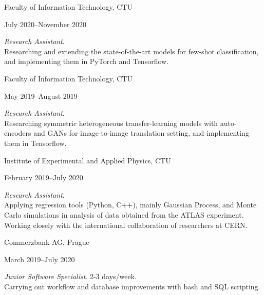 \documentclass[10pt]{article}
\begin{document}
\begin{large}
    Faculty of Information Technology, CTU\hfill
    \begin{small}
        July 2020--November 2020\\[0.2em]
    \end{small}
\end{large}
\begin{normalsize}
    \textit{Research Assistant}.\\[0.2em]
    Researching and extending the state-of-the-art models for few-shot classification, and implementing them in PyTorch and Tensorflow.\\
\end{normalsize}

\begin{large}
    Faculty of Information Technology, CTU\hfill
    \begin{small}
        May 2019--August 2019\\[0.2em]
    \end{small}
\end{large}
\begin{normalsize}
    \textit{Research Assistant}.\\[0.2em]
    Researching symmetric heterogeneous transfer-learning models with auto-encoders and GANs for image-to-image translation setting, and implementing them in Tensorflow.\\
\end{normalsize}

\begin{large}
    Institute of Experimental and Applied Physics, CTU\hfill
    \begin{small}
        February 2019--July 2020\\[0.2em]
    \end{small}
\end{large}
\begin{normalsize}
    \textit{Research Assistant}.\\[0.2em]
    Applying regression tools (Python, C++), mainly Gaussian Process, and Monte Carlo simulations in analysis of data obtained from the ATLAS experiment. Working closely with the international collaboration of researchers at CERN.\\
\end{normalsize}

\begin{large}
    Commerzbank AG, Prague\hfill
    \begin{small}
        March 2019--July 2020\\[0.2em]
    \end{small}
\end{large}
\begin{normalsize}
    \textit{Junior Software Specialist}. 2-3 days/week.\\[0.2em]
    Carrying out workflow and database improvements with bash and SQL scripting.\\
\end{normalsize}
\end{document}
